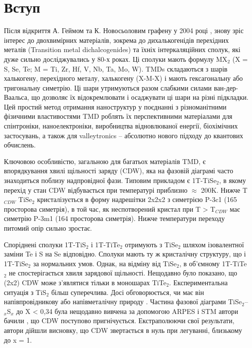 \chapter{Вступ}
Після відкриття А. Геймом та К. Новосьоловим графену у 2004 році \cite{Graphene}, знову зріс інтерес до двохвимірних матеріалів, зокрема до дихалькогенідів перехідних металів (Transition metal dichalcogenides) та їхніх інтеркаляційних сполук, які дуже сильно досліджувались у 80-х роках. Ці сполуки мають формулу MX$_{2}$ (X = S, Se, Te; M = Ti, Zr, Hf, V, Nb, Ta, Mo, W). TMDs складаються з шарів халькогену, перехідного металу, халькогену (X-M-X) і мають гексагональну або тригональну симетрію. Ці шари утримуються разом слабкими силами ван-дер-Ваальса, що дозволяє їх відокремлювати і осаджувати ці шари на різні підкладки. Цей простий метод отримання наноструктур у поєднанні з різноманітними фізичними властивостями TMD роблять їх перспективними матеріалами для спінтроніки, наноелектроніки, виробництва відновлюваної енергії, біохімічних застосувань, а також для valleytronics – абсолютно нового підходу до квантових обчислень.

Ключовою особливістю, загальною для багатьох матеріалів TMD, є впорядкування хвилі щільності заряду (CDW), яка на фазовій діаграмі часто знаходиться поблизу надпровідної фази. Типовим прикладом є 1T-TiSe$_2$, в якому перехід у стан CDW відбувається при температурі приблизно $\approx$ 200K. Нижче T$_{CDW}$ TiSe$_2$ кристалізується в форму надрешітки 2x2x2 з симетрією P-3c1 (165 просторова симетрія), в той час, як неспотворений кристал при T > T$_{CDW}$ має симетрію P-3m1 (164 просторова симетрія). Нижче температури переходу питомий опір сильно зростає.

Споріднені сполуки 1T-TiS$_2$ і 1T-TiTe$_2$ отримують з TiSe$_2$ шляхом ізовалентної заміни Te і S на Se відповідно. Сполуки мають ту ж кристалічну структуру, що і 1T-TiSe$_2$ за нормальних умов. Однак, на відміну від TiSe$_2$, в об'ємному 1T-TiTe$_2$ не спостерігається хвиля зарядової щільності. Нещодавно було показано, що (2x2) CDW може з'являтися тільки в моношарах TiTe$_2$. Експериментальна ситуація з TiS$_2$ більш суперечлива. Досі обговорюється, чи має він напівпровідникову або напівметалічну природу \cite{Dolui_2016}. Частина фазової діаграми TiSe$_2$--$_x$S$_x$ до X < 0,34 була нещодавно вивчена за допомогою ARPES і STM автори бачили \cite{Mottas_2019}, що CDW поступово пригнічується. Екстраполюючи свої результати, автори дійшли висновку, що CDW звертається в нуль при легуванні, близькому до x = 1.

